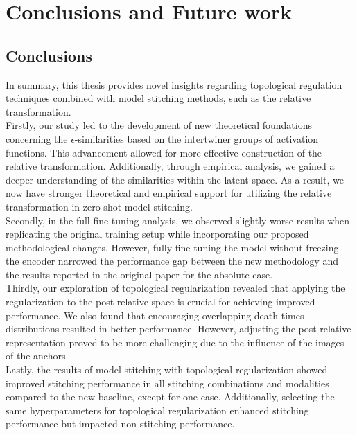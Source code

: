 \documentclass[../main.tex]{subfiles}
\begin{document}
\chapter{Conclusions and Future work}
\label{ch:conclusionsAndFutureWork}


\section{Conclusions}
\label{sec:conclusions}
In summary, this thesis provides novel insights regarding topological regulation techniques combined with model stitching methods, such as the relative transformation.\\

Firstly, our study led to the development of new theoretical foundations concerning the $\epsilon$-similarities based on the intertwiner groups of activation functions. This advancement allowed for more effective construction of the relative transformation. Additionally, through empirical analysis, we gained a deeper understanding of the similarities within the latent space. As a result, we now have stronger theoretical and empirical support for utilizing the relative transformation in zero-shot model stitching.\\

Secondly, in the full fine-tuning analysis, we observed slightly worse results when replicating the original training setup while incorporating our proposed methodological changes. However, fully fine-tuning the model without freezing the encoder narrowed the performance gap between the new methodology and the results reported in the original paper for the absolute case.\\

Thirdly, our exploration of topological regularization revealed that applying the regularization to the post-relative space is crucial for achieving improved performance. We also found that encouraging overlapping death times distributions resulted in better performance. However, adjusting the post-relative representation proved to be more challenging due to the influence of the images of the anchors.\\

Lastly, the results of model stitching with topological regularization showed improved stitching performance in all stitching combinations and modalities compared to the new baseline, except for one case. Additionally, selecting the same hyperparameters for topological regularization enhanced stitching performance but impacted non-stitching performance.\\
\end{document}
